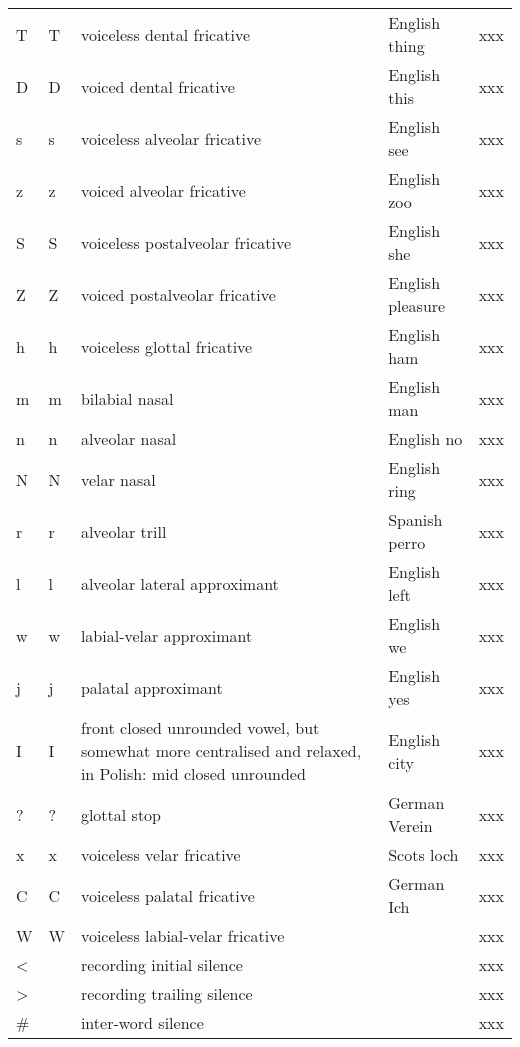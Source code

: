 \begin{longtable}{llp{}ll}
	T & T & voiceless dental fricative & English thing & xxx\\
	D & D & voiced dental fricative & English this & xxx\\
	s & s & voiceless alveolar fricative & English see & xxx\\
	z & z & voiced alveolar fricative & English zoo & xxx\\
	S & S & voiceless postalveolar fricative & English she & xxx\\
	Z & Z & voiced postalveolar fricative & English pleasure & xxx\\
	h & h & voiceless glottal fricative & English ham & xxx\\
	m & m & bilabial nasal & English man & xxx\\
	n & n & alveolar nasal & English no & xxx\\
	N & N & velar nasal & English ring & xxx\\
	r & r & alveolar trill & Spanish perro & xxx\\
	l & l & alveolar lateral approximant & English left & xxx\\
	w & w & labial-velar approximant & English we & xxx\\
	j & j & palatal approximant & English yes & xxx\\
	I & I & front closed unrounded vowel, but somewhat more centralised and relaxed, in Polish: mid closed unrounded & English city & xxx\\
	? & ? & glottal stop & German Verein & xxx\\
	x & x & voiceless velar fricative & Scots loch & xxx\\
	C & C & voiceless palatal fricative & German Ich & xxx\\
	W & W & voiceless labial-velar fricative & & xxx\\
	\textless & & recording initial silence & & xxx\\
	\textgreater & & recording trailing silence & & xxx\\
	\# & & inter-word silence & & xxx\\
\end{longtable}

\newpage
